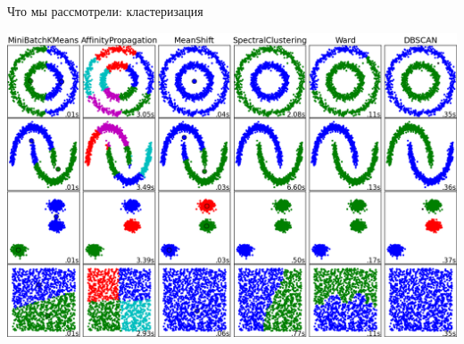 \documentclass[10pt,a4paper]{beamer}
\begin{document}

\begin{frame}{Что мы рассмотрели: кластеризация}

\begin{center}
\includegraphics[scale=0.2]{images/clustering.png}
\end{center}

\end{frame}

\end{document}
